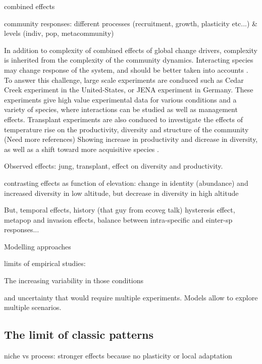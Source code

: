  combined effects
 
 community responses: different processes (recruitment, growth, plasticity etc...) \& levels (indiv, pop, metacommunity)
 

 In addition to complexity of combined effects of global change drivers, complexity is inherited from the complexity of the community dynamics. Interacting species may change response of the system, and should be better taken into accounts \parencite{gilman_framework_2010}. To answer this challenge, large scale experiments are conduced such as Cedar Creek experiment in the United-States, or JENA experiment in Germany. These experiments give high value experimental data for various conditions and a variety of species, where interactions can be studied as well as management effects.
 Transplant experiments are also conduced to investigate the effects of temperature rise on the productivity, diversity and structure of the community \cite{scheepens_genotypic_2010}(Need more references) Showing increase in productivity and dicrease in diversity, as well as a shift toward more acquisitive species \parencite{debouk_functional_2015}.
 
 Observed effects: jung, transplant, effect on diversity and productivity.
 
contrasting effects as function of elevation: change in identity (abundance) and increased diversity in low altitude, but decrease in diversity in high altitude \parencite{rosbakh_elevation_2014}
 
 But, temporal effects, history (that guy from ecoveg talk) hysteresis effect, metapop and invasion effects, balance between intra-specific and einter-sp responses...
 
 Modelling approaches   
 
 
limits of empirical studies: \parencite{merila_climate_2014}

 
 \parencite{schirpke_multiple_2012}

 The increasing variability in those conditions 
 
 and uncertainty that would require multiple experiments. Models allow to explore multiple scenarios.

\subsection{The limit of classic patterns}

niche vs process: stronger effects because no plasticity or local adaptation \cite{morin_comparing_2009}
